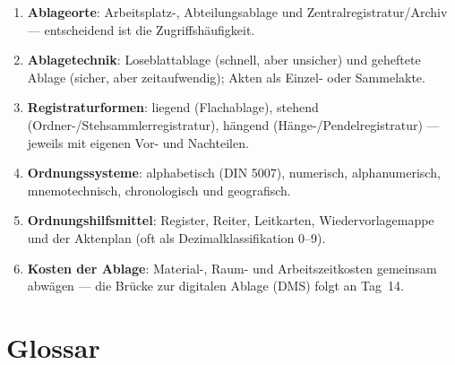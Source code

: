 \documentclass[11pt, a4paper]{article}
\begin{document}
\begin{enumerate}
  \item \textbf{Ablageorte}: Arbeitsplatz-, Abteilungsablage und Zentralregistratur/Archiv --- entscheidend ist die Zugriffshäufigkeit.
  \item \textbf{Ablagetechnik}: Loseblattablage (schnell, aber unsicher) und geheftete Ablage (sicher, aber zeitaufwendig); Akten als Einzel- oder Sammelakte.
  \item \textbf{Registraturformen}: liegend (Flachablage), stehend (Ordner-/Stehsammlerregistratur), hängend (Hänge-/Pendelregistratur) --- jeweils mit eigenen Vor- und Nachteilen.
  \item \textbf{Ordnungssysteme}: alphabetisch (DIN 5007), numerisch, alphanumerisch, mnemotechnisch, chronologisch und geografisch.
  \item \textbf{Ordnungshilfsmittel}: Register, Reiter, Leitkarten, Wiedervorlagemappe und der Aktenplan (oft als Dezimalklassifikation 0--9).
  \item \textbf{Kosten der Ablage}: Material-, Raum- und Arbeitszeitkosten gemeinsam abwägen --- die Brücke zur digitalen Ablage (DMS) folgt an Tag~14.
\end{enumerate}

\newpage

\section*{Glossar}






\end{document}
